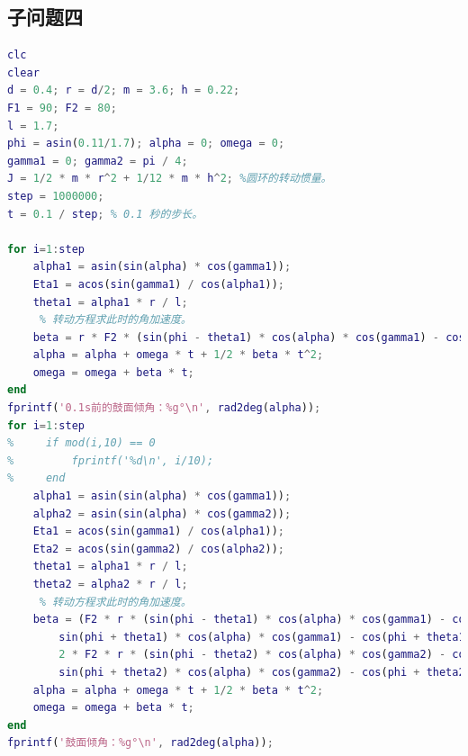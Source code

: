 \documentclass{cumcm}
\begin{document}
\subsection{子问题四}
\begin{lstlisting}[language=matlab]
clc
clear
d = 0.4; r = d/2; m = 3.6; h = 0.22;
F1 = 90; F2 = 80;
l = 1.7;
phi = asin(0.11/1.7); alpha = 0; omega = 0;
gamma1 = 0; gamma2 = pi / 4;
J = 1/2 * m * r^2 + 1/12 * m * h^2; %圆环的转动惯量。
step = 1000000;
t = 0.1 / step; % 0.1 秒的步长。

for i=1:step
    alpha1 = asin(sin(alpha) * cos(gamma1));
    Eta1 = acos(sin(gamma1) / cos(alpha1));
    theta1 = alpha1 * r / l;
     % 转动方程求此时的角加速度。
    beta = r * F2 * (sin(phi - theta1) * cos(alpha) * cos(gamma1) - cos(phi - theta1) * sin(alpha1) * sin(Eta1)) / J;
    alpha = alpha + omega * t + 1/2 * beta * t^2;
    omega = omega + beta * t;
end
fprintf('0.1s前的鼓面倾角：%g°\n', rad2deg(alpha));
for i=1:step
%     if mod(i,10) == 0
%         fprintf('%d\n', i/10);
%     end
    alpha1 = asin(sin(alpha) * cos(gamma1));
    alpha2 = asin(sin(alpha) * cos(gamma2));
    Eta1 = acos(sin(gamma1) / cos(alpha1));
    Eta2 = acos(sin(gamma2) / cos(alpha2));
    theta1 = alpha1 * r / l;
    theta2 = alpha2 * r / l;
     % 转动方程求此时的角加速度。
    beta = (F2 * r * (sin(phi - theta1) * cos(alpha) * cos(gamma1) - cos(phi - theta1) * sin(alpha1) * sin(Eta1) - ...
        sin(phi + theta1) * cos(alpha) * cos(gamma1) - cos(phi + theta1) * sin(alpha1) * sin(Eta1)) + ...
        2 * F2 * r * (sin(phi - theta2) * cos(alpha) * cos(gamma2) - cos(phi - theta2) * sin(alpha2) * sin(Eta2) - ...
        sin(phi + theta2) * cos(alpha) * cos(gamma2) - cos(phi + theta2) * sin(alpha2) * sin(Eta2))) / J;
    alpha = alpha + omega * t + 1/2 * beta * t^2;
    omega = omega + beta * t;
end
fprintf('鼓面倾角：%g°\n', rad2deg(alpha));
\end{lstlisting}
\end{document}

